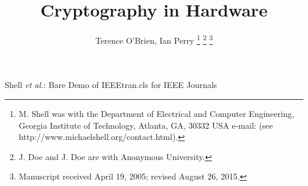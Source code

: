 \documentclass[journal]{IEEEtran}
\begin{document}
%
\title{Cryptography in Hardware}
%
%
%

\author{Terence O'Brien,
        Ian Perry
\thanks{M. Shell was with the Department
of Electrical and Computer Engineering, Georgia Institute of Technology, Atlanta,
GA, 30332 USA e-mail: (see http://www.michaelshell.org/contact.html).}%
\thanks{J. Doe and J. Doe are with Anonymous University.}%
\thanks{Manuscript received April 19, 2005; revised August 26, 2015.}}

% 
%



%
{Shell \MakeLowercase{\textit{et al.}}: Bare Demo of IEEEtran.cls for IEEE Journals}
% 
\end{document}
